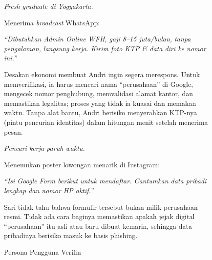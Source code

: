 \documentclass[12pt,a4paper]{article}
\begin{document}
\begin{figure}[H]
\centering
\begin{adjustwidth}{0.50cm}{0pt}
\begin{tcbraster}[raster columns=2, raster equal height=rows, raster column skip=4mm,
  enhanced, colback=verfinblue!4, colframe=verfinblue!55, colbacktitle=verfinblue!85,
  coltitle=white, fonttitle=\bfseries\footnotesize, left=2mm, right=2mm, top=1.2mm,
  bottom=1.2mm, boxrule=0.6pt, arc=1.5mm, title filled]
\begin{tcolorbox}[title={Persona 1 \,\textbullet\, Andri (22)}]
\footnotesize
\textit{Fresh graduate di Yogyakarta.}
\smallskip

Menerima \textit{broadcast} WhatsApp:
\begin{tcolorbox}[colback=white, colframe=verfinblue!25, boxrule=0.4pt, arc=1mm,
  left=1.5mm, right=1.5mm, top=0.8mm, bottom=0.8mm]
\itshape\footnotesize ``Dibutuhkan Admin Online WFH, gaji 8--15 juta/bulan, tanpa pengalaman,
langsung kerja. Kirim foto KTP \& data diri ke nomor ini.''
\end{tcolorbox}
Desakan ekonomi membuat Andri ingin segera merespons. Untuk memverifikasi, ia harus mencari nama
``perusahaan'' di Google, mengecek nomor penghubung, memvalidasi alamat kantor, dan memastikan
legalitas; proses yang tidak ia kuasai dan memakan waktu. Tanpa alat bantu, Andri berisiko
menyerahkan KTP-nya (pintu pencurian identitas) dalam hitungan menit setelah menerima pesan.
\end{tcolorbox}
\begin{tcolorbox}[title={Persona 2 \,\textbullet\, Sari (27)}]
\footnotesize
\textit{Pencari kerja paruh waktu.}
\smallskip

Menemukan poster lowongan menarik di Instagram:
\begin{tcolorbox}[colback=white, colframe=verfinblue!25, boxrule=0.4pt, arc=1mm,
  left=2mm, right=2mm, top=0.8mm, bottom=0.8mm]
\itshape\footnotesize ``Isi Google Form berikut untuk mendaftar. Cantumkan data pribadi lengkap
dan nomor HP aktif.''
\end{tcolorbox}
Sari tidak tahu bahwa formulir tersebut bukan milik perusahaan resmi. Tidak ada cara baginya
memastikan apakah jejak digital ``perusahaan'' itu asli atau baru dibuat kemarin, sehingga data
pribadinya berisiko masuk ke basis phishing.
\end{tcolorbox}
\end{tcbraster}
\end{adjustwidth}
  \caption{Persona Pengguna Verifin}
  \label{fig:persona}
\end{figure}
\end{document}
